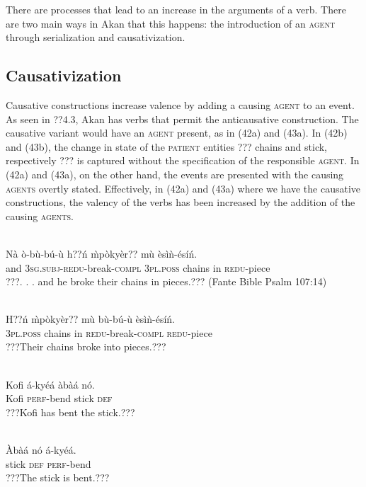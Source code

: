 \documentclass[output=paper]{langsci/langscibook}
\begin{document}
There are processes that lead to an increase in the arguments of a verb. There are two main ways in Akan that this happens: the introduction of an \textsc{agent} through serialization and causativization.

\subsection{Causativization}

Causative constructions increase valence by adding a causing \textsc{agent} to an event. As seen in ??4.3, Akan has verbs that permit the anticausative construction. The causative variant would have an \textsc{agent} present, as in (42a) and (43a). In (42b) and (43b), the change in state of the \textsc{patient} entities ??? chains and stick, respectively ??? is captured without the specification of the responsible \textsc{agent}. In (42a) and (43a), on the other hand, the events are presented with the causing \textsc{agents} overtly stated. Effectively, in (42a) and (43a) where we have the causative constructions, the valency of the verbs has been increased by the addition of the causing \textsc{agents}.


\ea\label{ex:}
\\
\gll Nà  ò-b\`{u}-bú-\`{u}      h??ń    \`{m}pòkyèr??  m\`{u}   èsìǹ-ésíń.\\
     and  \textsc{3sg.subj}{}-\textsc{redu}{}-break-\textsc{compl}  \textsc{3pl.poss}  chains    in  \textsc{redu}{}-piece\\
\glt ???. . . and he broke their chains in pieces.??? (Fante Bible Psalm 107:14)
\z

\ea\label{ex:}
\\
\gll H??ń  \`{m}pòkyèr??   m\`{u}  b\`{u}-bú-\`{u}     èsìǹ-ésíń.\\
     \textsc{3pl.poss}  chains    in  \textsc{redu}{}-break-\textsc{compl}  \textsc{redu}{}-piece\\
\glt ???Their chains broke into pieces.???
\z


\ea\label{ex:}
\\
\gll Kofi  á-kyéá    àbàá  nó.\\
     Kofi  \textsc{perf}{}-bend  stick  \textsc{def}\\
\glt ???Kofi has bent the stick.???
\z

\ea\label{ex:}
\\
\gll \`{A}bàá  nó  á-kyéá.\\
     stick  \textsc{def}  \textsc{perf}{}-bend\\
\glt ???The stick is bent.???
\z
\end{document}

